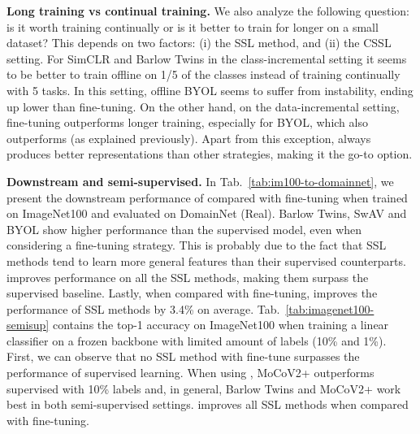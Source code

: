 \noindent\textbf{Long training vs continual training.} We also analyze the following question: is it worth training continually or is it better to train for longer on a small dataset? This depends on two factors: (i) the SSL method, and (ii) the CSSL setting. For SimCLR and Barlow Twins in the class-incremental setting it seems to be better to train offline on 1/5 of the classes instead of training continually with 5 tasks. In this setting, offline BYOL seems to suffer from instability, ending up lower than fine-tuning. On the other hand, on the data-incremental setting, fine-tuning outperforms longer training, especially for BYOL, which also outperforms \name{} (as explained previously). Apart from this exception, \name{} always produces better representations than other strategies, making it the go-to option.

\noindent\textbf{Downstream and semi-supervised.}
In Tab.~\ref{tab:im100-to-domainnet}, we present the downstream performance of \name{} compared with fine-tuning when trained on ImageNet100 and evaluated on DomainNet (Real). Barlow Twins, SwAV and BYOL show higher performance than the supervised model, even when considering a fine-tuning strategy. This is probably due to the fact that SSL methods tend to learn more general features than their supervised counterparts. \name{} improves performance on all the SSL methods, making them surpass the supervised baseline. Lastly, when compared with fine-tuning, \name{} improves the performance of SSL methods by 3.4\% on average.
Tab.~\ref{tab:imagenet100-semisup} contains the top-1 accuracy on ImageNet100 when training a linear classifier on a frozen backbone with limited amount of labels (10\% and 1\%). First, we can observe that no SSL method with fine-tune surpasses the performance of supervised learning. When using \name{}, MoCoV2+ outperforms supervised with 10\% labels and, in general, Barlow Twins and MoCoV2+ work best in both semi-supervised settings.
\name{} improves all SSL methods when compared with fine-tuning.


